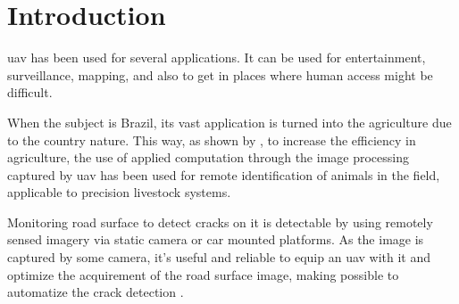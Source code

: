\chapter[Introduction]{Introduction}\label{cha:intro}

\acrfull{uav} has been used for several applications. 
It can be used for entertainment, surveillance, mapping, and also to get in places where human access might be difficult.

When the subject is Brazil, its vast application is turned into the agriculture due to the country nature. 
This way, as shown by \textcite{de2020method}, to increase the efficiency in agriculture, the use of applied computation through the image processing captured by \acrshort{uav} has been used for remote identification of animals in the field, applicable to precision livestock systems. 

Monitoring road surface to detect cracks on it is detectable by using remotely sensed imagery via static camera or car mounted platforms. As the image is captured by some camera, it's useful and reliable to equip an \acrshort{uav} with it and optimize the acquirement of the road surface image, making possible to automatize the crack detection \cite{dadrasjavan2019automatic}.